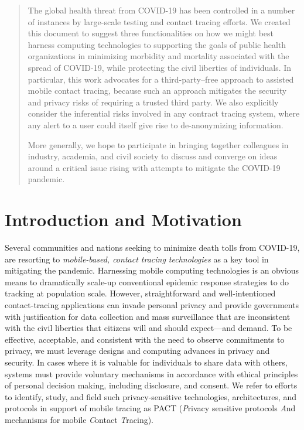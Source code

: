 \begin{abstract}
The global health threat from COVID-19 has been controlled in a number of instances by large-scale testing and contact tracing efforts.
We created this document to suggest three functionalities on how we might best harness computing technologies to supporting the goals of public health organizations in minimizing morbidity and mortality associated with the spread of COVID-19, 
while protecting the civil liberties of individuals.
In particular, this work advocates for a third-party--free approach to assisted mobile contact tracing, because such an approach mitigates the security and privacy risks of requiring a trusted third party. We also explicitly consider the inferential risks involved in any contract tracing system, where any alert to a user could itself give rise to de-anonymizing information.  

More generally, we hope to participate in bringing together colleagues in industry, academia, and civil society to discuss and converge on ideas around a critical issue rising with attempts to mitigate the COVID-19 pandemic.
\end{abstract}


\section{Introduction and Motivation}

Several communities and nations seeking to minimize death tolls from COVID-19, are resorting to \emph{mobile-based, contact tracing technologies} as a key tool in mitigating the pandemic. Harnessing mobile computing technologies is an obvious means to dramatically scale-up conventional epidemic response strategies to do tracking at population scale. However, straightforward and well-intentioned contact-tracing applications can invade personal privacy and provide governments with justification for data collection and mass surveillance that are inconsistent with the civil liberties that citizens will and should expect---and demand. To be effective, acceptable, and consistent with the need to observe commitments to privacy, we must leverage designs and computing advances in privacy and security. In cases where it is valuable for individuals to share data with others, systems must provide voluntary mechanisms in accordance with ethical principles of personal decision making, including disclosure, and consent. We refer to efforts to identify, study, and field such privacy-sensitive technologies, architectures, and protocols in support of mobile tracing as PACT (\emph{P}rivacy sensitive protocols \emph{A}nd mechanisms for mobile \emph{C}ontact \emph{T}racing).

